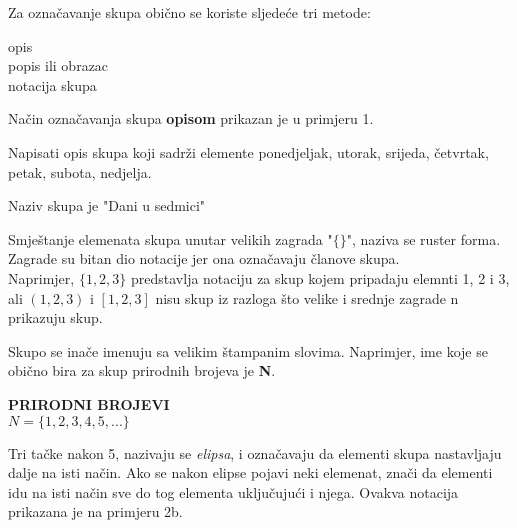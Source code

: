 \documentclass[a4paper, 14pt]{article}
\newcounter{counter}
\newcommand{\examplecounter}{\textbf{\refstepcounter{counter}PRIMJER \thecounter}}
\begin{document}
Za označavanje skupa obično se koriste sljedeće tri metode:
\begin{center}
opis\\
popis ili obrazac\\
notacija skupa
\end{center}
Način označavanja skupa \textbf{opisom} prikazan je u primjeru 1.
\begin{tcolorbox}[title=\large \examplecounter \hfill\small\textbf{"Opis skupova"}]
Napisati opis skupa koji sadrži elemente ponedjeljak, utorak, srijeda, četvrtak, petak, subota, nedjelja.
\begin{tcolorbox}[title=\small \textbf{RJEŠENJE},colback=white]
\begin{center}
Naziv skupa je "Dani u sedmici"
\end{center}
\end{tcolorbox}
\end{tcolorbox}

Smještanje elemenata skupa unutar velikih zagrada "$\{ \}$", naziva se ruster forma. Zagrade su bitan dio notacije jer ona označavaju članove skupa.\\
Naprimjer, $\{1, 2, 3\}$ predstavlja notaciju za skup kojem pripadaju elemnti 1, 2 i 3, ali $(1, 2, 3)$ i $[1, 2, 3]$ nisu skup iz razloga što velike i srednje zagrade n prikazuju skup.

Skupo se inače imenuju sa velikim štampanim slovima. Naprimjer, ime koje se obično bira za skup prirodnih brojeva je \textbf{N}.\\
\begin{tcolorbox}
\begin{center}
\textbf{\textsc{PRIRODNI BROJEVI}}\\
$N = \{1, 2, 3, 4, 5, ... \}$
\end{center}
\end{tcolorbox}
Tri tačke nakon 5, nazivaju se \textit{elipsa}, i označavaju da elementi skupa nastavljaju dalje na isti način. Ako se nakon elipse pojavi neki elemenat, znači da elementi idu na isti način sve do tog elementa uključujući i njega. Ovakva notacija prikazana je na primjeru 2b.
\end{document}
